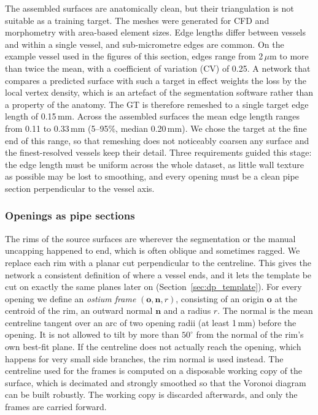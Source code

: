 The assembled surfaces are anatomically clean, but their triangulation is not suitable as a training target. The meshes were generated for CFD and morphometry with area-based element sizes. Edge lengths differ between vessels and within a single vessel, and sub-micrometre edges are common. On the example vessel used in the figures of this section, edges range from 2\,$\mu$m to more than twice the mean, with a coefficient of variation (CV) of 0.25. A network that compares a predicted surface with such a target in effect weights the loss by the local vertex density, which is an artefact of the segmentation software rather than a property of the anatomy. The GT is therefore remeshed to a single target edge length of 0.15\,mm. Across the assembled surfaces the mean edge length ranges from 0.11 to 0.33\,mm (5--95\%, median 0.20\,mm). We chose the target at the fine end of this range, so that remeshing does not noticeably coarsen any surface and the finest-resolved vessels keep their detail. Three requirements guided this stage: the edge length must be uniform across the whole dataset, as little wall texture as possible may be lost to smoothing, and every opening must be a clean pipe section perpendicular to the vessel axis.

\subsubsection*{Openings as pipe sections}

The rims of the source surfaces are wherever the segmentation or the manual uncapping happened to end, which is often oblique and sometimes ragged. We replace each rim with a planar cut perpendicular to the centreline. This gives the network a consistent definition of where a vessel ends, and it lets the template be cut on exactly the same planes later on (Section~\ref{sec:dp_template}). For every opening we define an \emph{ostium frame} $(\mathbf{o}, \mathbf{n}, r)$, consisting of an origin $\mathbf{o}$ at the centroid of the rim, an outward normal $\mathbf{n}$ and a radius $r$. The normal is the mean centreline tangent over an arc of two opening radii (at least 1\,mm) before the opening. It is not allowed to tilt by more than $50^\circ$ from the normal of the rim's own best-fit plane. If the centreline does not actually reach the opening, which happens for very small side branches, the rim normal is used instead. The centreline used for the frames is computed on a disposable working copy of the surface, which is decimated and strongly smoothed so that the Voronoi diagram can be built robustly. The working copy is discarded afterwards, and only the frames are carried forward.

